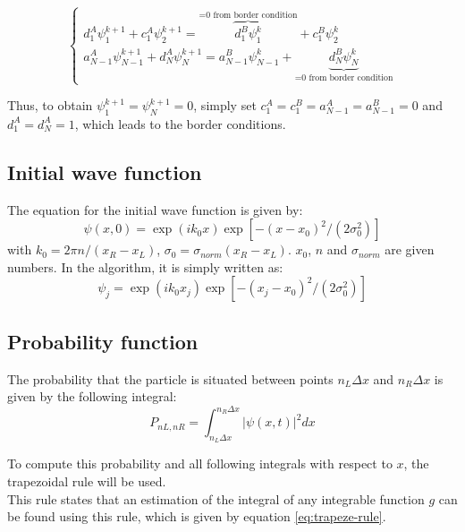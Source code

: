 \documentclass[a4paper,12pt,twoside]{article}
\begin{document}
      \begin{equation}
        \begin{cases}
          d_1^A\psi_1^{k+1} +c_1^A\psi_2^{k+1} = \overbrace{d_1^B\psi_1^k}^\text{=0 from border condition} + c_1^B\psi_2^k\\
          a_{N-1}^A\psi_{N-1}^{k+1} + d_N^A\psi_N^{k+1} = a_{N-1}^B\psi_{N-1}^k + \underbrace{d_N^B\psi_N^k}_\text{=0 from border condition}
        \end{cases}
        \label{eq:border_cond_eq}
      \end{equation}

      Thus, to obtain $\psi_1^{k+1} = \psi_N^{k+1} = 0$, simply set $c_1^A = c_1^B = a_{N-1}^A = a_{N-1}^B = 0$ and $d_1^A = d_N^A = 1$, which leads to the border conditions.

  \subsection{Initial wave function}
    The equation for the initial wave function is given by:
    \begin{equation}
     \psi(x,0)=\exp(ik_0x)\exp\left[-(x-x_0)^2/(2\sigma_0^2)\right]
     \label{eq:psiinit}
    \end{equation}
    with $k_0=2\pi n/(x_R-x_L)$, $\sigma_0=\sigma_{norm}(x_R-x_L)$. $x_0$, $n$ and $\sigma_{norm}$ are given numbers.
    In the algorithm, it is simply written as:
    \begin{equation}
     \psi_j=\exp(ik_0x_j)\exp\left[-(x_j-x_0)^2/(2\sigma_0^2)\right]
     \label{eq:psiinitdis}
    \end{equation}

  \subsection{Probability function}
    The probability that the particle is situated between points $n_L\Delta x$ and $n_R\Delta x$ is given by the following integral:
    \begin{equation}
     P_{nL,nR} = \int_{n_L\Delta x}^{n_R\Delta x} |\psi(x,t)|^2 dx
    \end{equation}

    To compute this probability and all following integrals with respect to $x$, the trapezoidal rule will be used.\\
    This rule states that an estimation of the integral of any integrable function $g$ can be found using this rule, which is given by equation \eqref{eq:trapeze-rule}.
\end{document}
